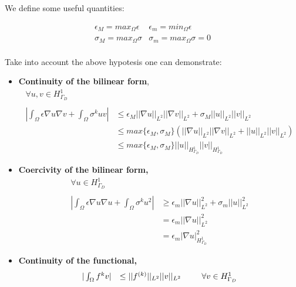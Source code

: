 We define some useful quantities:

\begin{equation*}
\begin{array}{ll}
\epsilon_M = max_{\Omega} \epsilon & \epsilon_m = min_{\Omega} \epsilon \\
\sigma_M = max_{\Omega} \sigma & \sigma_m = max_{\Omega} \sigma = 0 \\
\end{array}
\end{equation*}

Take into account the above hypotesis one can demonstrate:
\begin{itemize}
\item \textbf{Continuity of the bilinear form},
\begin{equation*}
\begin{array}{ll}
\forall u,v \in H^1_{\Gamma_D} &\\ \\
|\int_{\Omega} \epsilon \nabla u \nabla v + \int_{\Omega} \sigma^{k}u v| 
& \leq \epsilon_{M} ||\nabla u ||_{L^2} || \nabla v ||_{L^2} +  \sigma_{M} ||u ||_{L^2} ||v ||_{L^2} 
\\
& \leq max\{\epsilon_{M}, \sigma_{M} \}  
\left( ||\nabla u ||_{L^2} || \nabla v ||_{L^2} +   ||u ||_{L^2} ||v ||_{L^2} \right)
\\
& \leq max\{\epsilon_{M}, \sigma_{M} \}  
||u ||_{H^1_{\Gamma_D}} || v ||_{H^1_{\Gamma_D}}
\end{array}
\end{equation*}

\item \textbf{Coercivity of the bilinear form,}
\begin{equation*}
\begin{array}{ll}
\forall u \in H^1_{\Gamma_D} &\\ \\
|\int_{\Omega} \epsilon \nabla u \nabla u + \int_{\Omega} \sigma^{k}u^2| 
& \geq \epsilon_{m} ||\nabla u ||_{L^2}^2  +  \sigma_{m} ||u ||_{L^2}^2 
\\
& =  \epsilon_{m} ||\nabla u ||_{L^2}^2 
\\
& = \epsilon_{m} |\nabla u |_{H^1_{\Gamma_D}}^2 
\end{array}
\end{equation*}

\item \textbf{Continuity of the functional,}
\begin{equation*}
\begin{array}{ll}
|\int_{\Omega} f^{k} v |
& \leq ||f^{(k)} ||_{L^2}||v ||_{L^2} \psp{15} \forall v \in H^1_{\Gamma_D}
\end{array}
\end{equation*}
\end{itemize}


